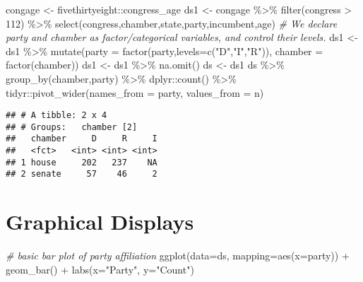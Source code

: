 \documentclass[
]{book}
\newenvironment{Shaded}{\begin{snugshade}}{\end{snugshade}}
\newcommand{\AttributeTok}[1]{\textcolor[rgb]{0.77,0.63,0.00}{#1}}
\newcommand{\CommentTok}[1]{\textcolor[rgb]{0.56,0.35,0.01}{\textit{#1}}}
\newcommand{\DecValTok}[1]{\textcolor[rgb]{0.00,0.00,0.81}{#1}}
\newcommand{\FunctionTok}[1]{\textcolor[rgb]{0.00,0.00,0.00}{#1}}
\newcommand{\NormalTok}[1]{#1}
\newcommand{\OtherTok}[1]{\textcolor[rgb]{0.56,0.35,0.01}{#1}}
\newcommand{\SpecialCharTok}[1]{\textcolor[rgb]{0.00,0.00,0.00}{#1}}
\newcommand{\StringTok}[1]{\textcolor[rgb]{0.31,0.60,0.02}{#1}}
\begin{document}
\begin{Shaded}
\begin{Highlighting}[]
\NormalTok{congage }\OtherTok{\textless{}{-}}\NormalTok{ fivethirtyeight}\SpecialCharTok{::}\NormalTok{congress\_age}
\NormalTok{ds1 }\OtherTok{\textless{}{-}}\NormalTok{ congage }\SpecialCharTok{\%\textgreater{}\%} \FunctionTok{filter}\NormalTok{(congress }\SpecialCharTok{\textgreater{}} \DecValTok{112}\NormalTok{) }\SpecialCharTok{\%\textgreater{}\%} \FunctionTok{select}\NormalTok{(congress,chamber,state,party,incumbent,age) }
\CommentTok{\#  We declare party and chamber as factor/categorical variables, and control their levels.}
\NormalTok{ds1 }\OtherTok{\textless{}{-}}\NormalTok{ ds1 }\SpecialCharTok{\%\textgreater{}\%} \FunctionTok{mutate}\NormalTok{(}\AttributeTok{party =} \FunctionTok{factor}\NormalTok{(party,}\AttributeTok{levels=}\FunctionTok{c}\NormalTok{(}\StringTok{"D"}\NormalTok{,}\StringTok{"I"}\NormalTok{,}\StringTok{"R"}\NormalTok{)),}
                    \AttributeTok{chamber =} \FunctionTok{factor}\NormalTok{(chamber))}
\NormalTok{ds1 }\OtherTok{\textless{}{-}}\NormalTok{ ds1 }\SpecialCharTok{\%\textgreater{}\%} \FunctionTok{na.omit}\NormalTok{()}
\NormalTok{ds }\OtherTok{\textless{}{-}}\NormalTok{ ds1  }
\NormalTok{ds }\SpecialCharTok{\%\textgreater{}\%} \FunctionTok{group\_by}\NormalTok{(chamber,party) }\SpecialCharTok{\%\textgreater{}\%} 
\NormalTok{  dplyr}\SpecialCharTok{::}\FunctionTok{count}\NormalTok{() }\SpecialCharTok{\%\textgreater{}\%} 
\NormalTok{  tidyr}\SpecialCharTok{::}\FunctionTok{pivot\_wider}\NormalTok{(}\AttributeTok{names\_from =}\NormalTok{ party, }\AttributeTok{values\_from =}\NormalTok{ n)}
\end{Highlighting}
\end{Shaded}

\begin{verbatim}
## # A tibble: 2 x 4
## # Groups:   chamber [2]
##   chamber     D     R     I
##   <fct>   <int> <int> <int>
## 1 house     202   237    NA
## 2 senate     57    46     2
\end{verbatim}

\hypertarget{graphical-displays}{%
\section{Graphical Displays}\label{graphical-displays}}

\begin{Shaded}
\begin{Highlighting}[]
\CommentTok{\# basic bar plot of party affiliation}
\FunctionTok{ggplot}\NormalTok{(}\AttributeTok{data=}\NormalTok{ds, }\AttributeTok{mapping=}\FunctionTok{aes}\NormalTok{(}\AttributeTok{x=}\NormalTok{party)) }\SpecialCharTok{+} 
  \FunctionTok{geom\_bar}\NormalTok{() }\SpecialCharTok{+}
  \FunctionTok{labs}\NormalTok{(}\AttributeTok{x=}\StringTok{"Party"}\NormalTok{, }\AttributeTok{y=}\StringTok{"Count"}\NormalTok{)}
\end{Highlighting}
\end{Shaded}
\end{document}
